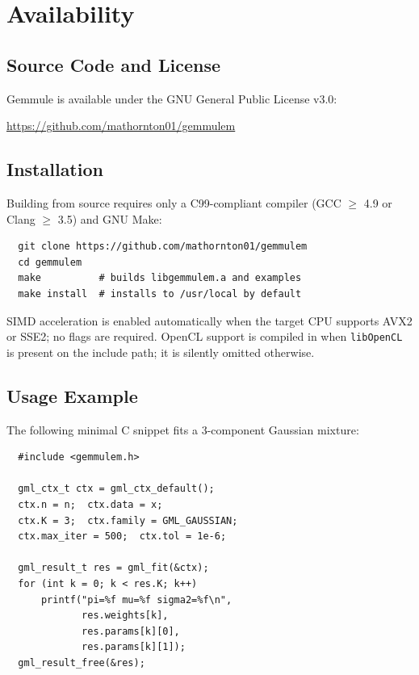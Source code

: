 ﻿\documentclass[10pt,twocolumn]{article}
\begin{document}
\section{Availability}

\subsection{Source Code and License}

Gemmule is available under the GNU General Public License v3.0:
\begin{center}
  \url{https://github.com/mathornton01/gemmulem}
\end{center}

\subsection{Installation}

Building from source requires only a C99-compliant compiler
(GCC $\geq$ 4.9 or Clang $\geq$ 3.5) and GNU Make:

\begin{verbatim}
  git clone https://github.com/mathornton01/gemmulem
  cd gemmulem
  make          # builds libgemmulem.a and examples
  make install  # installs to /usr/local by default
\end{verbatim}

SIMD acceleration is enabled automatically when the target CPU supports
AVX2 or SSE2; no flags are required.
OpenCL support is compiled in when \texttt{libOpenCL} is present on the
include path; it is silently omitted otherwise.

\subsection{Usage Example}

The following minimal C snippet fits a 3-component Gaussian mixture:

\begin{verbatim}
  #include <gemmulem.h>

  gml_ctx_t ctx = gml_ctx_default();
  ctx.n = n;  ctx.data = x;
  ctx.K = 3;  ctx.family = GML_GAUSSIAN;
  ctx.max_iter = 500;  ctx.tol = 1e-6;

  gml_result_t res = gml_fit(&ctx);
  for (int k = 0; k < res.K; k++)
      printf("pi=%f mu=%f sigma2=%f\n",
             res.weights[k],
             res.params[k][0],
             res.params[k][1]);
  gml_result_free(&res);
\end{verbatim}
\end{document}
